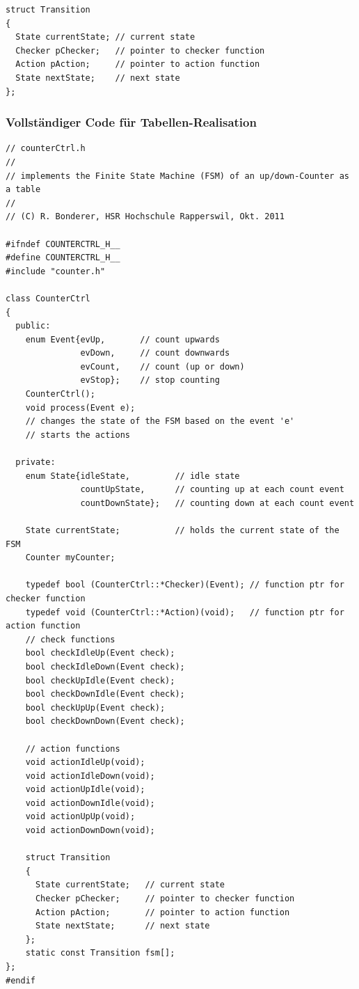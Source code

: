 \begin{itemize}
\begin{lstlisting}[style=Cpp]
struct Transition 
{
  State currentState; // current state
  Checker pChecker;   // pointer to checker function
  Action pAction;     // pointer to action function
  State nextState;    // next state
};
\end{lstlisting}
\end{itemize}

\subsubsection{Vollständiger Code für Tabellen-Realisation}
\begin{lstlisting}[style=Cpp]
// counterCtrl.h
//
// implements the Finite State Machine (FSM) of an up/down-Counter as a table
//
// (C) R. Bonderer, HSR Hochschule Rapperswil, Okt. 2011

#ifndef COUNTERCTRL_H__
#define COUNTERCTRL_H__
#include "counter.h"

class CounterCtrl
{
  public:
    enum Event{evUp,       // count upwards
               evDown,     // count downwards
               evCount,    // count (up or down)
               evStop};    // stop counting
    CounterCtrl();
    void process(Event e);
    // changes the state of the FSM based on the event 'e'
    // starts the actions

  private:
    enum State{idleState,         // idle state
               countUpState,      // counting up at each count event
               countDownState};   // counting down at each count event

    State currentState;           // holds the current state of the FSM
    Counter myCounter;
    
    typedef bool (CounterCtrl::*Checker)(Event); // function ptr for checker function
    typedef void (CounterCtrl::*Action)(void);   // function ptr for action function
    // check functions
    bool checkIdleUp(Event check);
    bool checkIdleDown(Event check);
    bool checkUpIdle(Event check);
    bool checkDownIdle(Event check);
    bool checkUpUp(Event check);
    bool checkDownDown(Event check);
    
    // action functions
    void actionIdleUp(void);
    void actionIdleDown(void);
    void actionUpIdle(void);
    void actionDownIdle(void);
    void actionUpUp(void);
    void actionDownDown(void);
    
    struct Transition
    {
      State currentState;   // current state
      Checker pChecker;     // pointer to checker function
      Action pAction;       // pointer to action function
      State nextState;      // next state
    };
    static const Transition fsm[];
};
#endif
\end{lstlisting}


